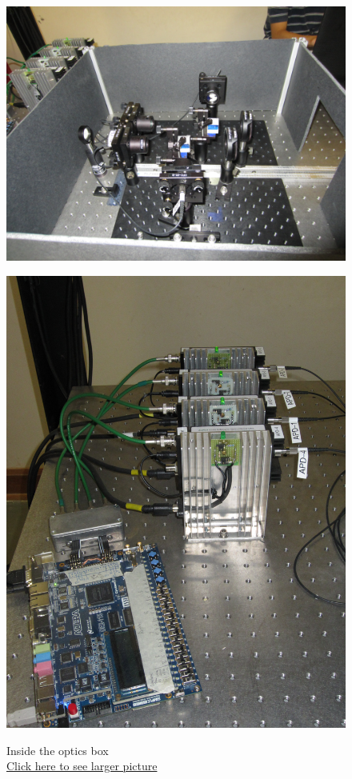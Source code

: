 \documentclass{../lab}
\begin{document}
\begin{figure}[H]
  \href{http://experimentationlab.berkeley.edu/sites/default/files/images/QIE_0615.jpg}{\includegraphics[width=\linewidth,keepaspectratio]{images/QIE_0615.jpg}}
  \caption{Inside the optics box \\
  \href{http://experimentationlab.berkeley.edu/sites/default/files/images/QIE_0615.jpg}{Click here to see larger picture}}
  \label{fig:QIE_0615.jpg}
\endminipage\hfill
{}
  \href{http://experimentationlab.berkeley.edu/sites/default/files/images/QIE_APDs_0616.jpg}{\includegraphics[width=\linewidth,keepaspectratio]{images/QIE_APDs_0616.jpg}}

\end{figure}
\end{document}
